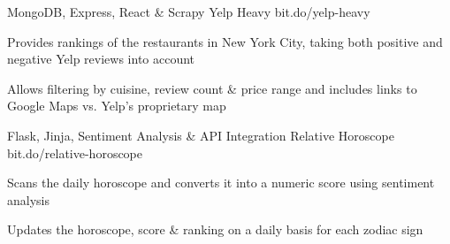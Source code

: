 

\begin{cventries}

 \cventry
    {MongoDB, Express, React \& Scrapy} %
    {Yelp Heavy} %
    {bit.do/yelp-heavy} %
    {} %
    {
      \begin{cvitems} %
        \item {Provides rankings of the restaurants in New York City, taking both positive and negative Yelp reviews into account}
        \item {Allows filtering by cuisine, review count \& price range and includes links to Google Maps vs. Yelp's proprietary map}
      \end{cvitems}
    }

 \cventry
    {Flask, Jinja, Sentiment Analysis \& API Integration} %
    {Relative Horoscope} %
    {bit.do/relative-horoscope} %
    {} %
    {
      \begin{cvitems} %
        \item {Scans the daily horoscope and converts it into a numeric score using sentiment analysis}
        \item {Updates the horoscope, score \& ranking on a daily basis for each zodiac sign}
      \end{cvitems}
    }

\end{cventries}